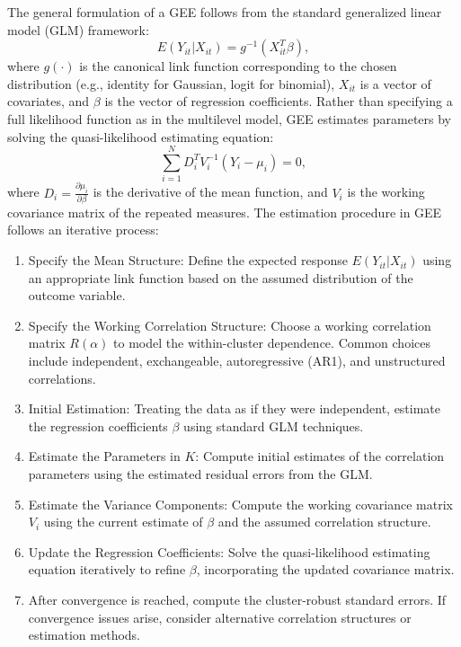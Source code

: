 \documentclass[stu]{apa7}
\begin{document}
The general formulation of a GEE follows from the standard generalized linear model (GLM) framework:
\begin{equation}
E(Y_{it} | X_{it}) = g^{-1}(X_{it}^T \beta),
\end{equation}
where \( g(\cdot) \) is the canonical link function corresponding to the chosen distribution (e.g., identity for Gaussian, logit for binomial), \( X_{it} \) is a vector of covariates, and \( \beta \) is the vector of regression coefficients. Rather than specifying a full likelihood function as in the multilevel model, GEE estimates parameters by solving the quasi-likelihood estimating equation:
\begin{equation}
\sum_{i=1}^{N} D_i^T V_i^{-1} (Y_i - \mu_i) = 0,
\end{equation}
where \( D_i = \frac{\partial \mu_i}{\partial \beta} \) is the derivative of the mean function, and \( V_i \) is the working covariance matrix of the repeated measures. The estimation procedure in GEE follows an iterative process:
\begin{enumerate}
    \item Specify the Mean Structure: Define the expected response \( E(Y_{it} | X_{it}) \) using an appropriate link function based on the assumed distribution of the outcome variable.
    \item Specify the Working Correlation Structure: Choose a working correlation matrix \( R(\alpha) \) to model the within-cluster dependence. Common choices include independent, exchangeable, autoregressive (AR1), and unstructured correlations.
    \item Initial Estimation: Treating the data as if they were independent, estimate the regression coefficients \( \beta \) using standard GLM techniques.
    \item Estimate the Parameters in $K$: Compute initial estimates of the correlation parameters using the estimated residual errors from the GLM.
    \item Estimate the Variance Components: Compute the working covariance matrix \( V_i \) using the current estimate of \( \beta \) and the assumed correlation structure.
    \item Update the Regression Coefficients: Solve the quasi-likelihood estimating equation iteratively to refine \( \beta \), incorporating the updated covariance matrix.
    \item After convergence is reached, compute the cluster-robust standard errors. If convergence issues arise, consider alternative correlation structures or estimation methods.
\end{enumerate}
\end{document}
